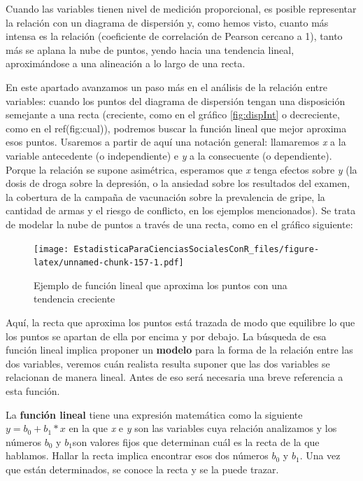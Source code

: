 \documentclass[]{book}
\begin{document}
Cuando las variables tienen nivel de medición proporcional, es posible
representar la relación con un diagrama de dispersión y, como hemos
visto, cuanto más intensa es la relación (coeficiente de correlación de Pearson cercano a 1), tanto más se aplana la nube de puntos, yendo hacia una tendencia lineal, aproximándose a una alineación a lo largo de una recta.

En este apartado avanzamos un paso más en el análisis de la relación
entre variables: cuando los puntos del diagrama de dispersión tengan una
disposición semejante a una recta (creciente, como en el gráfico \ref{fig:dispInt} o
decreciente, como en el ref(fig:cual)), podremos buscar la función lineal que mejor
aproxima esos puntos. Usaremos a partir de aquí una notación general:
llamaremos \emph{x} a la variable antecedente (o independiente) e \emph{y} a la
consecuente (o dependiente). Porque la relación se supone asimétrica,
esperamos que \emph{x} tenga efectos sobre \emph{y} (la dosis de droga sobre la
depresión, o la ansiedad sobre los resultados del examen, la cobertura de la campaña de vacunación sobre la prevalencia de gripe, la cantidad de armas y el riesgo de conflicto, en los ejemplos mencionados). Se trata de modelar la nube de puntos a través de
una recta, como en el gráfico siguiente:

\begin{figure}
\centering
\texttt{[image: EstadisticaParaCienciasSocialesConR\_files/figure-latex/unnamed-chunk-157-1.pdf]}
\caption{\label{fig:unnamed-chunk-157}Ejemplo de función lineal que aproxima los puntos con una tendencia creciente}
\end{figure}

Aquí, la recta que aproxima los puntos está trazada de modo que
equilibre lo que los puntos se apartan de ella por encima y por debajo.
La búsqueda de esa función lineal implica proponer un \textbf{modelo} para la
forma de la relación entre las dos variables, veremos cuán realista
resulta suponer que las dos variables se relacionan de manera lineal.
Antes de eso será necesaria una breve referencia a esta función.

La \textbf{función lineal} tiene una expresión matemática como la siguiente
\(y = b_{0} + b_{1}*x\) en la que \emph{x} e \emph{y} son las variables cuya
relación analizamos y los números \(b_{0}\) y \(b_{1}\)son valores fijos que
determinan cuál es la recta de la que hablamos. Hallar la recta implica
encontrar esos dos números \(b_{0}\) y \(b_{1}\). Una vez que están
determinados, se conoce la recta y se la puede trazar.
\end{document}
